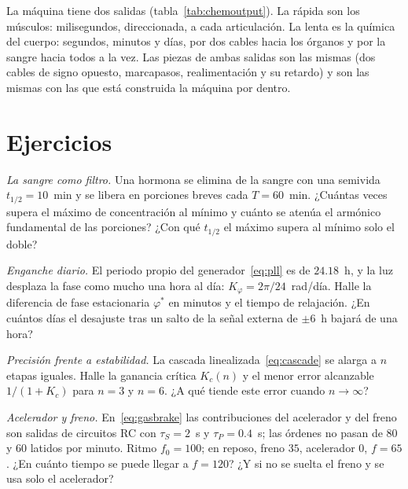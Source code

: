 La máquina tiene dos salidas (tabla~\ref{tab:chemoutput}). La rápida son los músculos: milisegundos, direccionada, a cada articulación. La lenta es la química del cuerpo: segundos, minutos y días, por dos cables hacia los órganos y por la sangre hacia todos a la vez. Las piezas de ambas salidas son las mismas (dos cables de signo opuesto, marcapasos, realimentación y su retardo) y son las mismas con las que está construida la máquina por dentro.

\section{Ejercicios}

\begin{exercise}[\lvlA]
\label{ex:16:1}
\emph{La sangre como filtro.} Una hormona se elimina de la sangre con una semivida $t_{1/2}=10$~min y se libera en porciones breves cada $T=60$~min. ¿Cuántas veces supera el máximo de concentración al mínimo y cuánto se atenúa el armónico fundamental de las porciones? ¿Con qué $t_{1/2}$ el máximo supera al mínimo solo el doble?
\end{exercise}

\begin{exercise}[\lvlA]
\label{ex:16:2}
\emph{Enganche diario.} El periodo propio del generador~\eqref{eq:pll} es de $24.18$~h, y la luz desplaza la fase como mucho una hora al día: $K_\varphi=2\pi/24$~rad/día. Halle la diferencia de fase estacionaria $\varphi^*$ en minutos y el tiempo de relajación. ¿En cuántos días el desajuste tras un salto de la señal externa de $\pm6$~h bajará de una hora?
\end{exercise}

\begin{exercise}[\lvlB]
\label{ex:16:3}
\emph{Precisión frente a estabilidad.} La cascada linealizada~\eqref{eq:cascade} se alarga a $n$ etapas iguales. Halle la ganancia crítica $K_c(n)$ y el menor error alcanzable $1/(1+K_c)$ para $n=3$ y $n=6$. ¿A qué tiende este error cuando $n\to\infty$?
\end{exercise}

\begin{exercise}[\lvlB]
\label{ex:16:4}
\emph{Acelerador y freno.} En~\eqref{eq:gasbrake} las contribuciones del acelerador y del freno son salidas de circuitos RC con $\tau_S=2$~s y $\tau_P=0.4$~s; las órdenes no pasan de $80$ y $60$ latidos por minuto. Ritmo $f_0=100$; en reposo, freno $35$, acelerador $0$, $f=65$. ¿En cuánto tiempo se puede llegar a $f=120$? ¿Y si no se suelta el freno y se usa solo el acelerador?
\end{exercise}

